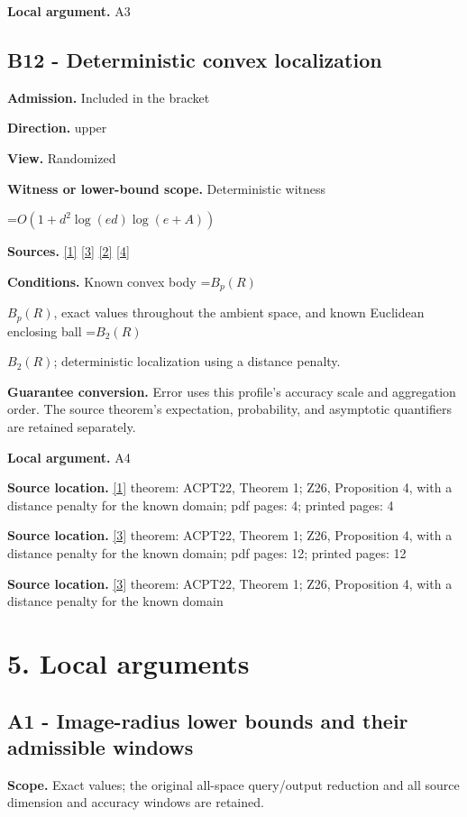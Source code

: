 \documentclass[10pt,a4paper]{article}
\newcommand{\AtlasMath}[1]{\par\begingroup\centering\setbox0=\hbox{$\displaystyle #1$}\ifdim\wd0>1.4\linewidth\typeout{ATLAS WIDE FORMULA: \the\wd0}\fi\ifdim\wd0>\linewidth\resizebox{\linewidth}{!}{\box0}\else\box0\fi\par\endgroup}
\newcommand{\AtlasInlineMath}[1]{\begingroup\setbox0=\hbox{$#1$}\ifdim\wd0>.4\linewidth\endgroup\AtlasMath{#1}\else\endgroup$#1$\fi}
\begin{document}
\textbf{Local argument.} A3

\subsection{B12 - Deterministic convex localization}
\textbf{Admission.} Included in the bracket

\textbf{Direction.} upper

\textbf{View.} Randomized

\textbf{Witness or lower-bound scope.} Deterministic witness

\AtlasMath{O(1+d^2\log(ed)\log(e+A))}
\textbf{Sources.} \href{https://proceedings.neurips.cc/paper_files/paper/2022/file/329ef22fd8cb68223d5df09a037f7dd9-Paper-Conference.pdf}{[1]} \href{https://arxiv.org/html/2607.16558v2}{[3]} \href{https://arxiv.org/html/2610.00345v1}{[2]} \href{https://www.mathnet.ru/php/archive.phtml?jrnid=mzm&option_lang=eng&paperid=1697&wshow=paper}{[4]}

\textbf{Conditions.} Known convex body \AtlasInlineMath{B_p(R)}, exact values throughout the ambient space, and known Euclidean enclosing ball \AtlasInlineMath{B_2(R)}; deterministic localization using a distance penalty.

\textbf{Guarantee conversion.} Error uses this profile's accuracy scale and aggregation order. The source theorem's expectation, probability, and asymptotic quantifiers are retained separately.

\textbf{Local argument.} A4

\textbf{Source location.} \href{https://proceedings.neurips.cc/paper_files/paper/2022/file/329ef22fd8cb68223d5df09a037f7dd9-Paper-Conference.pdf}{[1]} theorem: ACPT22, Theorem 1; Z26, Proposition 4, with a distance penalty for the known domain; pdf pages: 4; printed pages: 4

\textbf{Source location.} \href{https://arxiv.org/html/2607.16558v2}{[3]} theorem: ACPT22, Theorem 1; Z26, Proposition 4, with a distance penalty for the known domain; pdf pages: 12; printed pages: 12

\textbf{Source location.} \href{https://arxiv.org/html/2607.16558v2}{[3]} theorem: ACPT22, Theorem 1; Z26, Proposition 4, with a distance penalty for the known domain

\section{5. Local arguments}
\subsection{A1 - Image-radius lower bounds and their admissible windows}
\textbf{Scope.} Exact values; the original all-space query/output reduction and all source dimension and accuracy windows are retained.
\end{document}
